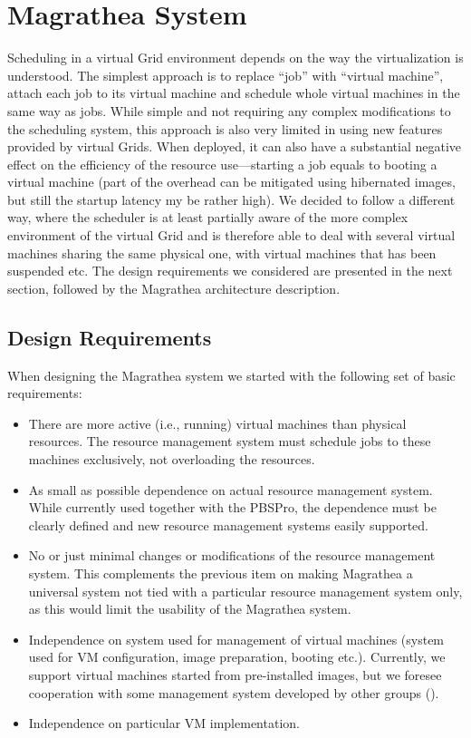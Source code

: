 \documentclass{sig-alternate}
\begin{document}

\section{Magrathea System}
\label{sec:magrathea}

Scheduling in a virtual Grid environment depends on the way the
virtualization is understood. The simplest approach is to replace ``job'' with
``virtual machine'', attach each job to its virtual machine and schedule
whole virtual machines in the same way as jobs. While simple and not
requiring any complex modifications to the scheduling system, this
approach is also very limited in using new features provided by
virtual Grids. When deployed, it can also have a substantial negative effect 
on the efficiency of the resource use---starting a job equals to booting
a virtual machine (part of the overhead can be mitigated using hibernated
images, but still the startup latency my be rather high). We decided to
follow a different way, where the scheduler is at least partially aware
of the more complex environment of the virtual Grid and is therefore able
to deal with several virtual machines sharing the same physical one, with
virtual machines that has been suspended etc. The design requirements we
considered are presented in the next section, followed by the Magrathea
architecture description.

\subsection{Design Requirements}
When designing the Magrathea system we started with the following set of
basic requirements:
\begin{itemize}
\item There are more active (i.e., running) virtual machines than
physical resources. The resource management system must schedule jobs to
these machines exclusively, not overloading the resources.
\item As small as possible dependence on actual resource management system.
While currently used together with the PBSPro, the dependence must be
clearly defined and new resource management systems easily supported.
\item No or just minimal changes or modifications of the resource
management system. This complements the previous item on making Magrathea
a universal system not tied with a particular resource management system
only, as this would limit the usability of the Magrathea system.
\item Independence on system used for management of virtual machines
(system used for VM configuration, image preparation, booting etc.).
Currently, we support virtual machines started from pre-installed images,
but we foresee cooperation with some management system developed by other
groups (\cite{invigo,workspaces}).
\item Independence on particular VM implementation. 
\end{itemize}
\end{document}

